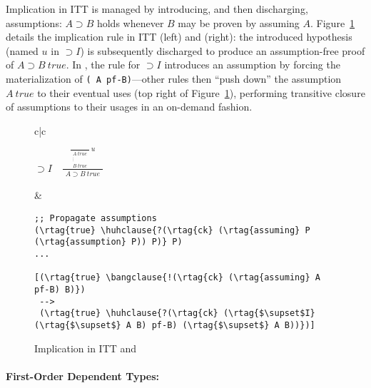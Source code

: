 Implication in ITT is managed by introducing, and then discharging,
assumptions: $A \supset B$ holds whenever $B$ may be proven by
assuming $A$. Figure~\ref{fig:impl} details the implication rule in
ITT (left) and \slog{} (right): the introduced hypothesis (named $u$
in $\supset{}\!I$) is subsequently discharged to produce an
assumption-free proof of $A \supset B~\textit{true}$. In \slog{}, the
rule for $\supset{}\!I$ introduces an assumption by forcing the
materialization of \texttt{( A pf-B)}---other rules
then ``push down'' the assumption $A~\textit{true}$ to their eventual
uses (top right of Figure~\ref{fig:impl}), performing transitive
closure of assumptions to their usages in an on-demand fashion.

\begin{figure}[h!]
\begin{tabular}{c|c}

${\supset{}\!I}\quad \frac { \frac{}{\begin{array}{c}A~\textit{true}\\\vdots\\ B~\textit{true}\end{array}}~u } {\begin{array}{c}A \supset B~\textit{true}\end{array}}$

&
\begin{minipage}{2.5in}
{
\vspace{-.5in}
\begin{Verbatim}[baselinestretch=.8,commandchars=\\\{\},codes={\catcode`$=3\catcode`^=7}]
;; Propagate assumptions
(\rtag{true} \huhclause{?(\rtag{ck} (\rtag{assuming} P (\rtag{assumption} P)) P)} P)
...

[(\rtag{true} \bangclause{!(\rtag{ck} (\rtag{assuming} A pf-B) B)})
 -->
 (\rtag{true} \huhclause{?(\rtag{ck} (\rtag{$\supset$I} (\rtag{$\supset$} A B) pf-B) (\rtag{$\supset$} A B))})]
\end{Verbatim}
}
\end{minipage}
\end{tabular}
\caption{Implication in ITT and \slog{}}
\label{fig:impl}
\end{figure}


\paragraph*{First-Order Dependent Types: \lf{}}

